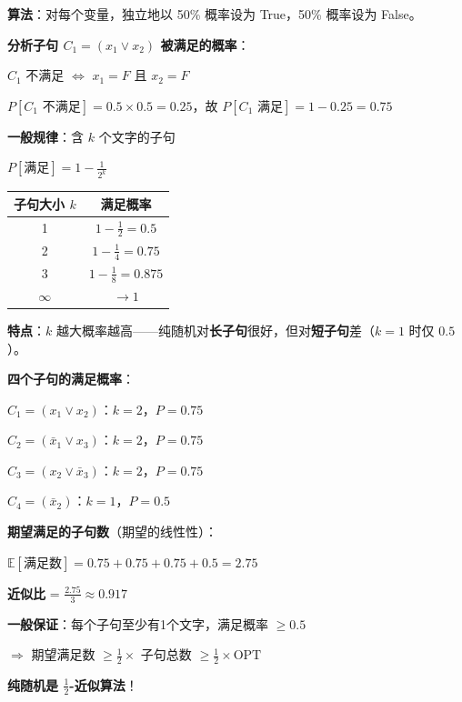 \documentclass[12pt, a4paper]{ctexart}
\begin{document}
\begin{blackboard}[方法1：纯随机算法（不用 LP！）]

\textbf{算法}：对每个变量，独立地以 50\% 概率设为 True，50\% 概率设为 False。

\textbf{分析子句 $C_1 = (x_1 \vee x_2)$ 被满足的概率}：

$C_1$ 不满足 $\Leftrightarrow$ $x_1 = F$ 且 $x_2 = F$

$P[C_1 \text{ 不满足}] = 0.5 \times 0.5 = 0.25$，故 $P[C_1 \text{ 满足}] = 1 - 0.25 = \mathbf{0.75}$

\textbf{一般规律}：含 $k$ 个文字的子句

$P[\text{满足}] = 1 - \frac{1}{2^k}$

\begin{center}
\begin{tabular}{c|c}
子句大小 $k$ & 满足概率 \\
\hline
1 & $1 - \frac{1}{2} = 0.5$ \\
2 & $1 - \frac{1}{4} = 0.75$ \\
3 & $1 - \frac{1}{8} = 0.875$ \\
$\infty$ & $\to 1$
\end{tabular}
\end{center}

\textbf{特点}：$k$ 越大概率越高——纯随机对\textbf{长子句}很好，但对\textbf{短子句}差（$k=1$ 时仅 $0.5$）。

\end{blackboard}

\begin{blackboard}[计算我们例子的期望]

\textbf{四个子句的满足概率}：

$C_1 = (x_1 \vee x_2)$：$k=2$，$P = 0.75$

$C_2 = (\bar{x}_1 \vee x_3)$：$k=2$，$P = 0.75$

$C_3 = (x_2 \vee \bar{x}_3)$：$k=2$，$P = 0.75$

$C_4 = (\bar{x}_2)$：$k=1$，$P = 0.5$

\textbf{期望满足的子句数}（期望的线性性）：

$\mathbb{E}[\text{满足数}] = 0.75 + 0.75 + 0.75 + 0.5 = \mathbf{2.75}$

\textbf{近似比} = $\frac{2.75}{3} \approx 0.917$

\textbf{一般保证}：每个子句至少有1个文字，满足概率 $\geq 0.5$

$\Rightarrow$ 期望满足数 $\geq \frac{1}{2} \times$ 子句总数 $\geq \frac{1}{2} \times \text{OPT}$

\textbf{纯随机是 $\frac{1}{2}$-近似算法}！

\end{blackboard}
\end{document}
